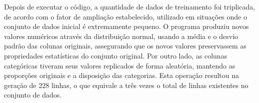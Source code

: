 Depois de executar o código, a quantidade de dados de treinamento foi triplicada, de acordo com o fator de ampliação estabelecido, utilizado em situações onde o conjunto de dados inicial é extremamente pequeno. O programa produziu novos valores numéricos através da distribuição normal, usando a média e o desvio padrão das colunas originais, assegurando que os novos valores preservassem as propriedades estatísticas do conjunto original. Por outro lado, as colunas categóricas tiveram seus valores replicados de forma aleatória, mantendo as proporções originais e a disposição das categorias. Esta operação resultou na geração de 228 linhas, o que equivale a três vezes o total de linhas existentes no conjunto de dados.